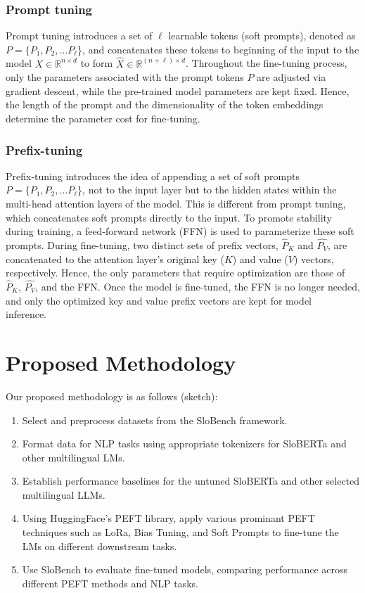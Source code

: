 \documentclass[fleqn,moreauthors,10pt]{ds_report}
\begin{document}
\subsubsection*{Prompt tuning}
Prompt tuning introduces a set of $\ell$ learnable tokens (soft prompts), denoted as $P =  \{P_1, P_2, \dots P_\ell$\},  and concatenates these tokens to beginning of the input to the model $X \in \mathbb{R}^{n\times d}$ to form $\hat{X} \in \mathbb{R}^{(n + \ell) \times d}$. Throughout the fine-tuning process, only the parameters associated with the prompt tokens $P$ are adjusted via gradient descent, while the pre-trained model parameters are kept fixed. Hence, the length of the prompt and the dimensionality of the token embeddings determine the parameter cost for fine-tuning.~\cite{prompt_tuning} 

\subsubsection*{Prefix-tuning}
Prefix-tuning introduces the idea of appending a set of soft prompts $P =  \{P_1, P_2, \dots P_\ell$\}, not to the input layer but to the hidden states within the multi-head attention layers of the model. This is different from prompt tuning, which concatenates  soft prompts directly to the input. To promote stability during training, a feed-forward network (FFN) is used to parameterize these soft prompts. During fine-tuning, two distinct sets of prefix vectors, $\hat{P}_K$ and $\hat{P_V}$, are concatenated to the attention layer's original key ($K$) and value ($V$) vectors, respectively. Hence, the only parameters that require optimization are those of $\hat{P}_K$, $\hat{P_V}$, and the FFN. Once the model is fine-tuned, the FFN is no longer needed, and only the optimized key and value prefix vectors are kept for model inference.~\cite{prefix_tuning}


\section{Proposed Methodology}
Our proposed methodology is as follows (sketch):
\begin{enumerate}
    \item Select and preprocess datasets from the SloBench framework.
    \item Format data for NLP tasks using appropriate tokenizers for SloBERTa and other multilingual LMs.
    \item Establish performance baselines for the untuned SloBERTa and other selected multilingual LLMs.
    \item Using HuggingFace's PEFT library, apply various prominant PEFT techniques such as LoRa, Bias Tuning, and Soft Prompts to fine-tune the LMs on different downstream tasks.
    \item Use SloBench to evaluate fine-tuned models, comparing performance across different PEFT methods and NLP tasks.
\end{enumerate}
\end{document}
